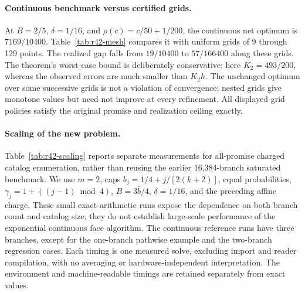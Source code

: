 \paragraph{Continuous benchmark versus certified grids.}
At $B=2/5$, $\delta=1/16$, and $\rho(c)=c/50+1/200$, the continuous net optimum is $7169/10400$. Table~\ref{tab:r42-mesh} compares it with uniform grids of 9 through 129 points. The realized gap falls from $19/10400$ to $57/166400$ along these grids. The theorem's worst-case bound is deliberately conservative: here $K_2=493/200$, whereas the observed errors are much smaller than $K_2h$. The unchanged optimum over some successive grids is not a violation of convergence; nested grids give monotone values but need not improve at every refinement. All displayed grid policies satisfy the original promise and realization ceiling exactly.

\paragraph{Scaling of the new problem.}
Table~\ref{tab:r42-scaling} reports separate measurements for all-promise charged catalog enumeration, rather than reusing the earlier 16,384-branch saturated benchmark. We use $m=2$, caps $b_j=1/4+j/[2(k+2)]$, equal probabilities, $\gamma_j=1+((j-1)\bmod4)$, $B=3\bar b/4$, $\delta=1/16$, and the preceding affine charge. These small exact-arithmetic runs expose the dependence on both branch count and catalog size; they do not establish large-scale performance of the exponential continuous face algorithm. The continuous reference runs have three branches, except for the one-branch pathwise example and the two-branch regression cases. Each timing is one measured solve, excluding import and reader compilation, with no averaging or hardware-independent interpretation. The environment and machine-readable timings are retained separately from exact values.

